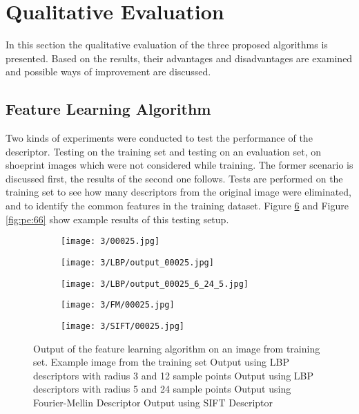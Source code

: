 \documentclass[draft,final]{vutinfth} %
\begin{document}
\section{Qualitative Evaluation}
In this section the qualitative evaluation of the three proposed algorithms is presented.
Based on the results, their advantages and disadvantages are examined and possible ways of improvement are discussed.  
\subsection{Feature Learning Algorithm}
\par
Two kinds of experiments were conducted to test the performance of the descriptor.
Testing on the training set and testing on an evaluation set, on shoeprint images which were not considered while training. 
The former scenario is discussed first, the results of the second one follows.
Tests are performed on the training set to see how many descriptors from the original image were eliminated, and to identify the common features in the training dataset.
Figure \ref{fig:pe:25} and Figure \ref{fig:pe:66} show example results of this testing setup.

\begin{figure}[h]
  \centering
  \begin{subfigure}[t]{0.19\columnwidth}
    \centering
    \texttt{[image: 3/00025.jpg]}
    \subcaption{}
    \label{fig:pe:25:orig}
  \end{subfigure}
  \begin{subfigure}[t]{0.19\columnwidth}
    \centering
    \texttt{[image: 3/LBP/output\_00025.jpg]}
    \subcaption{}
    \label{fig:pe:25:LBPs}
  \end{subfigure}
  \begin{subfigure}[t]{0.19\columnwidth}
    \centering
    \texttt{[image: 3/LBP/output\_00025\_6\_24\_5.jpg]}
    \subcaption{}
    \label{fig:pe:25:LBPb}
  \end{subfigure}
  \begin{subfigure}[t]{0.19\columnwidth}
    \centering
    \texttt{[image: 3/FM/00025.jpg]}
    \subcaption{}
    \label{fig:pe:25:FM}
  \end{subfigure}
  \begin{subfigure}[t]{0.19\columnwidth}
    \centering
    \texttt{[image: 3/SIFT/00025.jpg]}
    \subcaption{}
    \label{fig:pe:25:SIFT}
  \end{subfigure}
  \caption{Output of the feature learning algorithm on an image from training set. Example image from the training set  Output using LBP descriptors with radius 3 and 12 sample points  Output using LBP descriptors with radius 5 and 24 sample points  Output using Fourier-Mellin Descriptor  Output using SIFT Descriptor}
  \label{fig:pe:25}
\end{figure}
\end{document}
